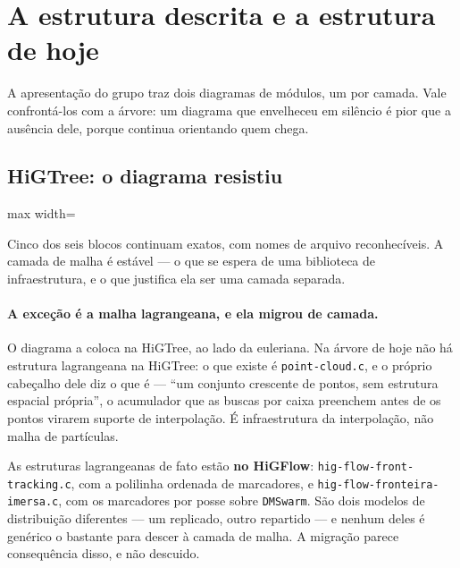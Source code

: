 \section{A estrutura descrita e a estrutura de hoje}
\label{sec:estrutura}

A apresenta\c{c}\~ao do grupo traz dois diagramas de m\'odulos, um por camada.
Vale confront\'a-los com a \'arvore: um diagrama que envelheceu em sil\^encio \'e
pior que a aus\^encia dele, porque continua orientando quem chega.

\subsection{HiGTree: o diagrama resistiu}

\begin{adjustbox}{max width=\linewidth}
\end{adjustbox}

Cinco dos seis blocos continuam exatos, com nomes de arquivo reconhec\'iveis. A
camada de malha \'e est\'avel --- o que se espera de uma biblioteca de
infraestrutura, e o que justifica ela ser uma camada separada.

\paragraph{A exce\c{c}\~ao \'e a malha lagrangeana, e ela migrou de camada.} O
diagrama a coloca na HiGTree, ao lado da euleriana. Na \'arvore de hoje n\~ao
h\'a estrutura lagrangeana na HiGTree: o que existe \'e
\texttt{point-cloud.c}, e o pr\'oprio cabe\c{c}alho dele diz o que \'e ---
``um conjunto crescente de pontos, sem estrutura espacial pr\'opria'', o
acumulador que as buscas por caixa preenchem antes de os pontos virarem suporte
de interpola\c{c}\~ao. \'E infraestrutura da interpola\c{c}\~ao, n\~ao malha de
part\'iculas.

As estruturas lagrangeanas de fato est\~ao \textbf{no HiGFlow}:
\texttt{hig-\allowbreak{}flow-\allowbreak{}front-\allowbreak{}tracking.\allowbreak{}c}, com a polilinha ordenada de marcadores, e
\texttt{hig-\allowbreak{}flow-\allowbreak{}fronteira-\allowbreak{}imersa.\allowbreak{}c}, com os marcadores por posse sobre
\texttt{DMSwarm}. S\~ao dois modelos de distribui\c{c}\~ao diferentes --- um
replicado, outro repartido --- e nenhum deles \'e gen\'erico o bastante para
descer \`a camada de malha. A migra\c{c}\~ao parece consequ\^encia disso, e
n\~ao descuido.

